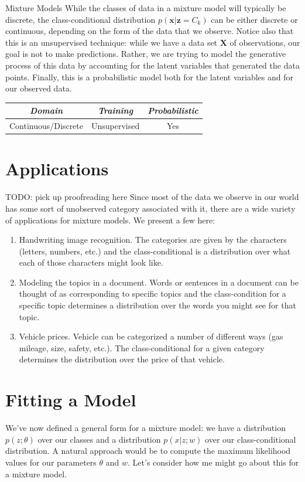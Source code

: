 \begin{mlcube}{Mixture Models}
While the classes of data in a mixture model will typically be discrete, the class-conditional distribution $p(\textbf{x} | \textbf{z} = C_k)$ can be either discrete or continuous, depending on the form of the data that we observe. Notice also that this is an unsupervised technique: while we have a data set $\textbf{X}$ of observations, our goal is not to make predictions. Rather, we are trying to model the generative process of this data by accounting for the latent variables that generated the data points. Finally, this is a probabilistic model both for the latent variables and for our observed data.
\begin{center}
    \begin{tabular}{c|c|c}
    \textit{\textbf{Domain}} & \textit{\textbf{Training}} & \textit{\textbf{Probabilistic}} \\
    \hline
    Continuous/Discrete & Unsupervised & Yes \\
    \end{tabular}
\end{center}
\end{mlcube}

\section{Applications}
TODO: pick up proofreading here
Since most of the data we observe in our world has some sort of unobserved category associated with it, there are a wide variety of applications for mixture models. We present a few here:
\begin{enumerate}
    \item Handwriting image recognition. The categories are given by the characters (letters, numbers, etc.) and the class-conditional is a distribution over what each of those characters might look like.
    \item Modeling the topics in a document. Words or sentences in a document can be thought of as corresponding to specific topics and the class-condition for a specific topic determines a distribution over the words you might see for that topic.
    \item Vehicle prices. Vehicle can be categorized a number of different ways (gas mileage, size, safety, etc.). The class-conditional for a given category determines the distribution over the price of that vehicle.
\end{enumerate}

\section{Fitting a Model}
We've now defined a general form for a mixture model: we have a distribution $p(z; \theta)$ over our classes and a distribution $p(x|z; w)$ over our class-conditional distribution. A natural approach would be to compute the maximum likelihood values for our parameters $\theta$ and $w$. Let's consider how me might go about this for a mixture model.

